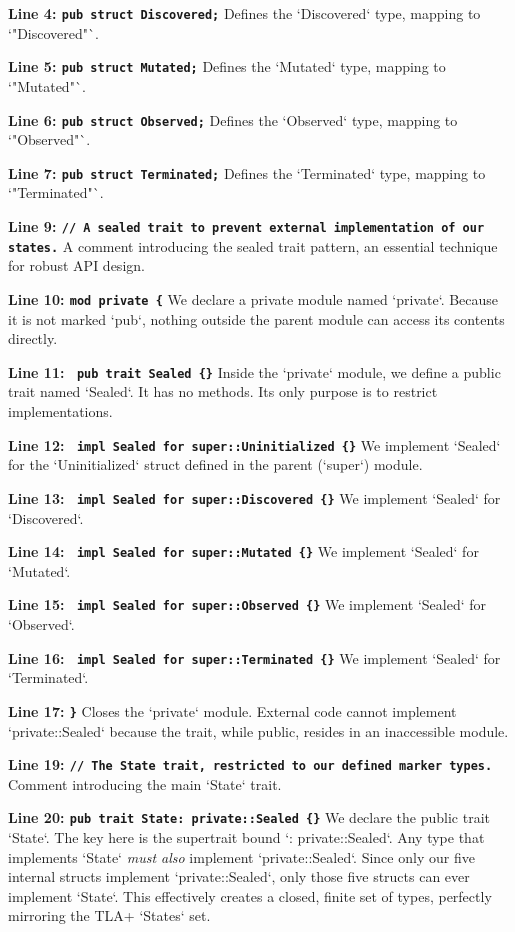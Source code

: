 \textbf{Line 4: \texttt{pub struct Discovered;}}
Defines the `Discovered` type, mapping to `"Discovered"`.

\textbf{Line 5: \texttt{pub struct Mutated;}}
Defines the `Mutated` type, mapping to `"Mutated"`.

\textbf{Line 6: \texttt{pub struct Observed;}}
Defines the `Observed` type, mapping to `"Observed"`.

\textbf{Line 7: \texttt{pub struct Terminated;}}
Defines the `Terminated` type, mapping to `"Terminated"`.

\textbf{Line 9: \texttt{// A sealed trait to prevent external implementation of our states.}}
A comment introducing the sealed trait pattern, an essential technique for robust API design.

\textbf{Line 10: \texttt{mod private \{}}
We declare a private module named `private`. Because it is not marked `pub`, nothing outside the parent module can access its contents directly.

\textbf{Line 11: \texttt{    pub trait Sealed \{\}}}
Inside the `private` module, we define a public trait named `Sealed`. It has no methods. Its only purpose is to restrict implementations.

\textbf{Line 12: \texttt{    impl Sealed for super::Uninitialized \{\}}}
We implement `Sealed` for the `Uninitialized` struct defined in the parent (`super`) module.

\textbf{Line 13: \texttt{    impl Sealed for super::Discovered \{\}}}
We implement `Sealed` for `Discovered`.

\textbf{Line 14: \texttt{    impl Sealed for super::Mutated \{\}}}
We implement `Sealed` for `Mutated`.

\textbf{Line 15: \texttt{    impl Sealed for super::Observed \{\}}}
We implement `Sealed` for `Observed`.

\textbf{Line 16: \texttt{    impl Sealed for super::Terminated \{\}}}
We implement `Sealed` for `Terminated`.

\textbf{Line 17: \texttt{\}}}
Closes the `private` module. External code cannot implement `private::Sealed` because the trait, while public, resides in an inaccessible module.

\textbf{Line 19: \texttt{// The State trait, restricted to our defined marker types.}}
Comment introducing the main `State` trait.

\textbf{Line 20: \texttt{pub trait State: private::Sealed \{\}}}
We declare the public trait `State`. The key here is the supertrait bound `: private::Sealed`. Any type that implements `State` \textit{must also} implement `private::Sealed`. Since only our five internal structs implement `private::Sealed`, only those five structs can ever implement `State`. This effectively creates a closed, finite set of types, perfectly mirroring the TLA+ `States` set.


